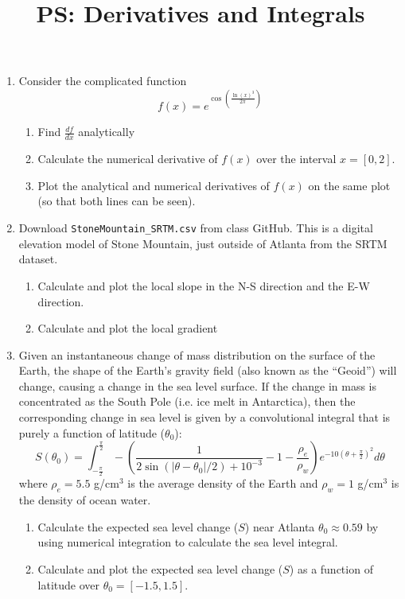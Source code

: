 \documentclass{article}
\title{\vspace{-1in} PS: Derivatives and Integrals}
\date{}
\newcommand{\beq}{\begin{equation*}}
\newcommand{\eeq}{\end{equation*}}
\newcommand{\be}{\begin{enumerate}}
\newcommand{\ee}{\end{enumerate}}
\begin{document}
\maketitle
\be 
\item Consider the complicated function
\begin{equation}
f(x) = e^{\cos (\frac{\ln(x)^3}{2 \pi})}
\end{equation}

\be
\item  Find $\frac{df}{dx}$ analytically

\item Calculate the numerical derivative of $f(x)$ over the interval $x=[0,2]$.

\item Plot the analytical and numerical derivatives of $f(x)$ on the same plot (so that both lines can be seen).

\ee

\item Download \texttt{StoneMountain\_SRTM.csv} from class GitHub. This is a digital elevation model of Stone Mountain, just outside of Atlanta from the SRTM dataset.

\be
\item Calculate and plot the local slope in the N-S direction and the E-W direction.

\item Calculate and plot the local gradient

\ee

\item Given an instantaneous change of mass distribution on the surface of the Earth, the shape of the Earth's gravity field (also known as the ``Geoid'') will change, causing a change in the sea level surface. If the change in mass is concentrated as the South Pole (i.e. ice melt in Antarctica), then the corresponding change in sea level is given by a convolutional integral that is purely a function of latitude ($\theta_0$):
\beq
S(\theta_0) = \int_{-\frac{\pi}{2}}^{\frac{\pi}{2}} -\left(\frac{1}{2 \sin (|\theta-\theta_0|/2) + 10^{-3}} - 1 - \frac{\rho_e}{\rho_w} \right) e^{-10 (\theta+\frac{\pi}{2})^2}  d \theta
\eeq
where $\rho_e=5.5$ g/cm$^3$ is the average density of the Earth and $\rho_w=1$ g/cm$^3$ is the density of ocean water.
\be
  \item Calculate the expected sea level change ($S$) near Atlanta $\theta_0 \approx 0.59$ by using numerical integration to calculate the sea level integral.
  \item Calculate and plot the expected sea level change ($S$) as a function of latitude over $\theta_0 = [-1.5,1.5]$.
\ee



\ee
\end{document}

